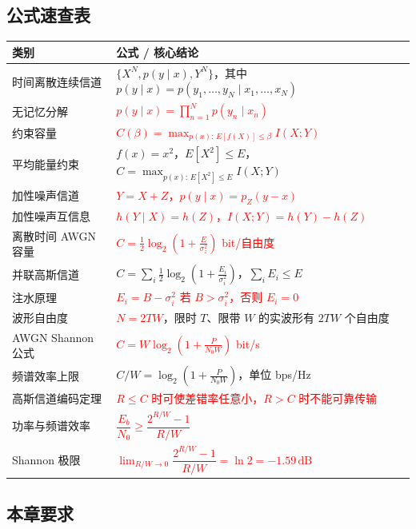 \subsection{公式速查表}

{\scriptsize
\noindent\begin{tabularx}{\textwidth}{@{}l>{\raggedright\arraybackslash}X@{}}
\toprule
\textbf{类别} & \textbf{公式 / 核心结论} \\
\midrule
时间离散连续信道 & $\{X^N,p(y\mid x),Y^N\}$，其中 $p(y\mid x)=p(y_1,\dots,y_N\mid x_1,\dots,x_N)$ \\
\midrule
无记忆分解 & \textcolor{Red}{$p(y\mid x)=\prod_{n=1}^{N}p(y_n\mid x_n)$} \\
\midrule
约束容量 & \textcolor{Red}{$C(\beta)=\max_{p(x):\,E[f(X)]\le\beta}I(X;Y)$} \\
\midrule
平均能量约束 & $f(x)=x^2$，$E[X^2]\le E$，$C=\max_{p(x):\,E[X^2]\le E}I(X;Y)$ \\
\midrule
加性噪声信道 & \textcolor{Red}{$Y=X+Z$，$p(y\mid x)=p_Z(y-x)$} \\
\midrule
加性噪声互信息 & \textcolor{Red}{$h(Y\mid X)=h(Z)$，$I(X;Y)=h(Y)-h(Z)$} \\
\midrule
离散时间 AWGN 容量 & \textcolor{Red}{$C=\frac12\log_2\left(1+\frac{E}{\sigma_z^2}\right)$ bit/自由度} \\
\midrule
并联高斯信道 & $C=\sum_i\frac12\log_2\left(1+\frac{E_i}{\sigma_i^2}\right)$，$\sum_iE_i\le E$ \\
\midrule
注水原理 & \textcolor{Red}{$E_i=B-\sigma_i^2$ 若 $B>\sigma_i^2$，否则 $E_i=0$} \\
\midrule
波形自由度 & \textcolor{Red}{$N=2TW$}，限时 $T$、限带 $W$ 的实波形有 $2TW$ 个自由度 \\
\midrule
AWGN Shannon 公式 & \textcolor{Red}{$C=W\log_2\left(1+\frac{P}{N_0W}\right)$ bit/s} \\
\midrule
频谱效率上限 & $C/W=\log_2\left(1+\frac{P}{N_0W}\right)$，单位 bps/Hz \\
\midrule
高斯信道编码定理 & \textcolor{Red}{$R\le C$ 时可使差错率任意小，$R>C$ 时不能可靠传输} \\
\midrule
功率与频谱效率 & \textcolor{Red}{$\dfrac{E_b}{N_0}\ge\dfrac{2^{R/W}-1}{R/W}$} \\
\midrule
Shannon 极限 & \textcolor{Red}{$\lim_{R/W\to0}\dfrac{2^{R/W}-1}{R/W}=\ln2=-1.59\,\mathrm{dB}$} \\
\bottomrule
\end{tabularx}
}

\subsection{本章要求}

